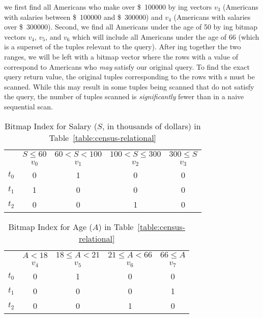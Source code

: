 we first find all Americans who make over \SI{100000}[\$]{} by ing
vectors \(v_3\) (Americans with salaries between \SI{100000}[\$]{} and
\SI{300000}[\$]{}) and \(v_4\) (Americans with salaries over \SI{300000}[\$]{}).
Second, we find all Americans under the age of 50 by ing bitmap vectors
\(v_4\), \(v_5\), and \(v_6\) which will include all Americans under the age of 66 (which is a superset of the tuples relevant to the query). After ing together the two ranges, we
will be left with a bitmap vector where the rows with a value of  correspond
to Americans who \emph{may} satisfy our original query. To find the exact query return value,
the original tuples corresponding to the rows with s must be scanned.
While this may result in some tuples being scanned that do not satisfy the query,
the number of tuples scanned is \emph{significantly} fewer than in a naive sequential scan.
\begin{table}[H]
    \centering
    \caption{Bitmap Index for Salary (\(S\), in thousands of dollars) in Table~\ref{table:census-relational}}
    \label{table:census-salary}
    \begin{tabular}{@{}r||c|c|c|c@{}}
        \toprule
                & \(S \leq 60\) & \(60 < S < 100\) & \(100 < S \leq 300\) & \(300 \leq S\) \\
                & \(v_0\) & \(v_1\) & \(v_2\) & \(v_3\) \\
        \midrule
        \(t_0\) & 0          & 1             & 0          & 0             \\
        \(t_1\) & 1          & 0             & 0          & 0             \\
        \(t_2\) & 0          & 0             & 1          & 0             \\
        \bottomrule
    \end{tabular}
\end{table}
%
\begin{table}[H]
    \centering
    \caption{Bitmap Index for Age (\(A\)) in Table~\ref{table:census-relational}}
    \label{table:census-age}
    \begin{tabular}{@{}r||c|c|c|c@{}}
        \toprule
                & \(A < 18\) & \(18 \leq  A < 21\) & \(21 \leq A < 66\) & \(66 \leq A\) \\
                & \(v_4\) & \(v_5\) & \(v_6\) & \(v_7\) \\
        \midrule
        \(t_0\) & 0          & 1             & 0          & 0             \\
        \(t_1\) & 0          & 0             & 0          & 1             \\
        \(t_2\) & 0          & 0             & 1          & 0             \\
        \bottomrule
    \end{tabular}
\end{table}
